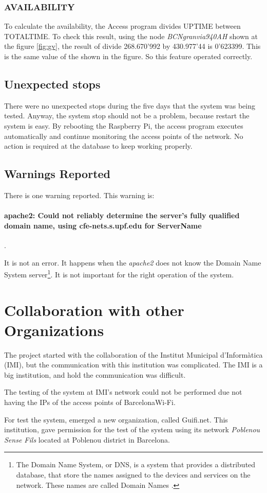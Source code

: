 \documentclass[12pt, a4paper,twoside]{tesi_upf}
\begin{document}
{    
    \subsubsection{AVAILABILITY}
    To calculate the availability, the Access program divides UPTIME between TOTALTIME. 
    To check this result, using the node \emph{BCNgranvia940AH} shown at the figure \ref{fig:gv}, the result of divide 268.670'992 by 430.977'44 is 0'623399. This is the same value of the shown in the figure. So this feature operated correctly.
    
    \subsection{Unexpected stops}
    There were no unexpected stops during the five days that the system was being tested.
Anyway, the system stop should not be a problem, because restart the system is easy. By rebooting the Raspberry Pi, the access program executes automatically and continue monitoring the access points of the network. No action is required at the database to keep working properly.
    
    \subsection{Warnings Reported}
    There is one warning reported. This warning is:
    
    \paragraph{apache2: Could not reliably determine the server's fully qualified domain name, using cfe-nets.s.upf.edu for ServerName}.
    
    It is not an error. It happens when the \textit{apache2} does not know the Domain Name System server\footnote{The Domain Name System, or DNS, is a system that provides a distributed database, that store the names assigned to the devices and services on the network. These names are called Domain Names \cite{DNS}.}. It is not important for the right operation of the system.
    
    \section{Collaboration with other Organizations}
    
    The project started with the collaboration of the Institut Municipal d'Informàtica (IMI), but the communication with this institution was complicated. The IMI is a big institution, and hold the communication was difficult.
    
    The testing of the system at IMI's network could not be performed due not having the IPs of the access points of BarcelonaWi-Fi.
    
    For test the system, emerged a new organization, called Guifi.net. This institution, gave permission for the test of the system using its network \emph{Poblenou Sense Fils} located at Poblenou district in Barcelona.} 
    
\end{document}
